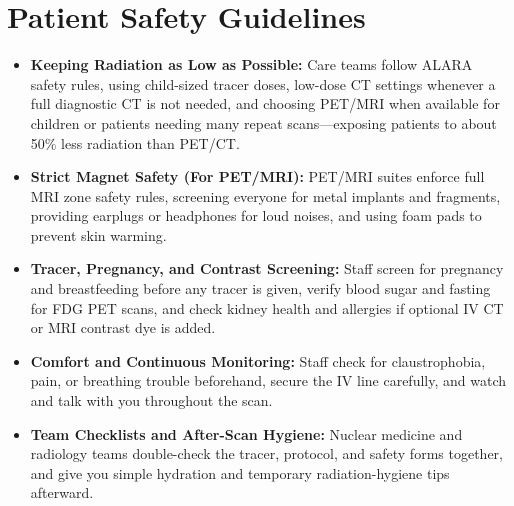 \section{Patient Safety Guidelines}
\begin{itemize}
    \item \textbf{Keeping Radiation as Low as Possible:} Care teams follow ALARA safety rules, using child-sized tracer doses, low-dose CT settings whenever a full diagnostic CT is not needed, and choosing PET/MRI when available for children or patients needing many repeat scans---exposing patients to about 50\% less radiation than PET/CT.
    \item \textbf{Strict Magnet Safety (For PET/MRI):} PET/MRI suites enforce full MRI zone safety rules, screening everyone for metal implants and fragments, providing earplugs or headphones for loud noises, and using foam pads to prevent skin warming.
    \item \textbf{Tracer, Pregnancy, and Contrast Screening:} Staff screen for pregnancy and breastfeeding before any tracer is given, verify blood sugar and fasting for FDG PET scans, and check kidney health and allergies if optional IV CT or MRI contrast dye is added.
    \item \textbf{Comfort and Continuous Monitoring:} Staff check for claustrophobia, pain, or breathing trouble beforehand, secure the IV line carefully, and watch and talk with you throughout the scan.
    \item \textbf{Team Checklists and After-Scan Hygiene:} Nuclear medicine and radiology teams double-check the tracer, protocol, and safety forms together, and give you simple hydration and temporary radiation-hygiene tips afterward.
\end{itemize}

